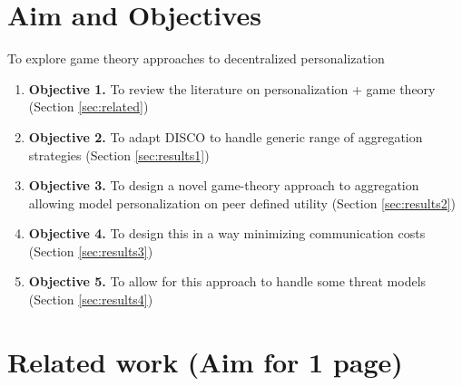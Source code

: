 \documentclass{article}
\begin{document}
    
    
    
    
    \newpage

\section{Aim and Objectives} %
\label{sec:aim}
To explore game theory approaches to decentralized personalization 
    \begin{enumerate}
        \item \textbf{Objective 1. } To review the literature on personalization + game theory (Section \ref{sec:related}) 
        \item \textbf{Objective 2. } To adapt DISCO to handle generic range of aggregation strategies (Section \ref{sec:results1})
        \item \textbf{Objective 3. } To design a novel game-theory approach to aggregation allowing model personalization on peer defined utility (Section \ref{sec:results2})
        \item \textbf{Objective 4. } To design this in a way minimizing communication costs (Section \ref{sec:results3})
        \item \textbf{Objective 5. } To allow for this approach to handle some threat models (Section \ref{sec:results4})
    \end{enumerate}
     \newpage
     
\section{Related work (Aim for 1 page)}
\end{document}
